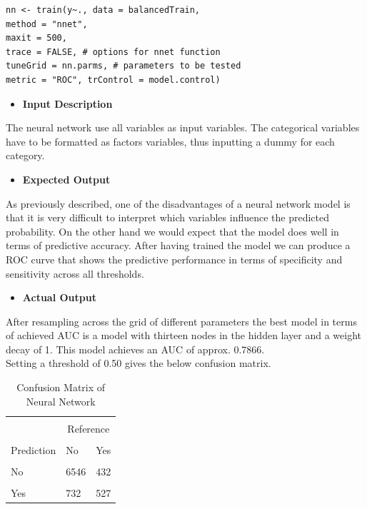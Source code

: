   	\begin{lstlisting}
nn <- train(y~., data = balancedTrain,  
method = "nnet", 
maxit = 500, 
trace = FALSE, # options for nnet function
tuneGrid = nn.parms, # parameters to be tested
metric = "ROC", trControl = model.control)
  	\end{lstlisting}
  	\begin{itemize}
  		\item \textbf{Input Description}
  	\end{itemize}
  	\noindent The neural network use all variables as input variables. The categorical variables have to be formatted as factors variables, thus inputting a dummy for each category. 
  	\begin{itemize}
  		\item \textbf{Expected Output}
  	\end{itemize}
  	As previously described, one of the disadvantages of a neural network model is that it is very difficult to interpret which variables influence the predicted probability. On the other hand we would expect that the model does well in terms of predictive accuracy. After having trained the model we can produce a ROC curve that shows the predictive performance in terms of specificity and sensitivity across all thresholds.\\   
  	\begin{itemize}
  		\item \textbf{Actual Output}
  	\end{itemize}
  	\noindent After resampling across the grid of different parameters the best model in terms of achieved AUC is a model with thirteen nodes in the hidden layer and a weight decay of 1. This model achieves an AUC of approx. 0.7866.\\
  	Setting a threshold of 0.50 gives the below confusion matrix.

\begin{center}
\begin{table}[!htbp]
	\centering  
	\begin{tabular}{llc}
		\hline
		\hline\\[-1.8ex]
		& \multicolumn{2}{c}{Reference} \\
		\cline{2-3}\\[-1.8ex]
		Prediction & No & Yes \\
		\hline \\[-1.8ex] 
		No & 6546 & 432 \\ 
		\hline \\[-1.8ex] 
		Yes& 732 & 527\\ 
		\hline
		\hline
	\end{tabular}  
	\caption{Confusion Matrix of Neural Network} 
\end{table}
\end{center}
 \newpage
 \pagestyle{fancy}
